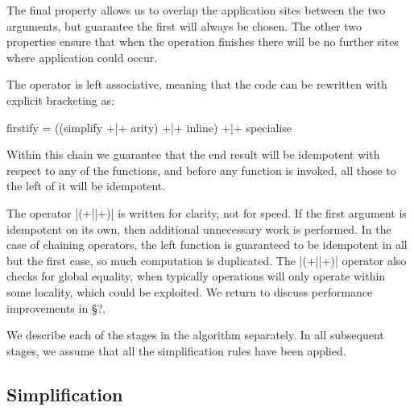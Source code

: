 \documentclass[preprint]{sigplanconf}
\begin{document}
The final property allows us to overlap the application sites between the two arguments, but guarantee the first will always be chosen. The other two properties ensure that when the operation finishes there will be no further sites where application could occur.

The operator is left associative, meaning that the code can be rewritten with explicit bracketing as:

\begin{code}
firstify = ((simplify +|+ arity) +|+ inline) +|+ specialise
\end{code}

Within this chain we guarantee that the end result will be idempotent with respect to any of the functions, and before any function is invoked, all those to the left of it will be idempotent.

The operator |(+||+)| is written for clarity, not for speed. If the first argument is idempotent on its own, then additional unnecessary work is performed. In the case of chaining operators, the left function is guaranteed to be idempotent in all but the first case, so much computation is duplicated. The |(+||+)| operator also checks for global equality, when typically operations will only operate within some locality, which could be exploited. We return to discuss performance improvements in \S?.

We describe each of the stages in the algorithm separately. In all subsequent stages, we assume that all the simplification rules have been applied.


\subsection{Simplification}
\end{document}
